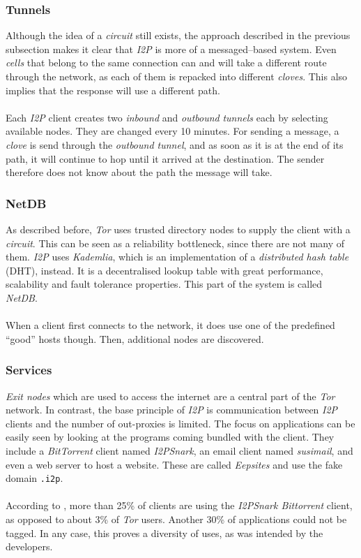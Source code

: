 \documentclass{sig-alternate}
\begin{document}
\subsubsection{Tunnels}
Although the idea of a \emph{circuit} still exists, the approach described in the previous subsection makes it clear that \emph{I2P} is more of a messaged--based system.
Even \emph{cells} that belong to the same connection can and will take a different route through the network, as each of them is repacked into different \emph{cloves}.
This also implies that the response will use a different path.
\\
\\
Each \emph{I2P} client creates two \emph{inbound} and \emph{outbound} \emph{tunnels} each by selecting available nodes.
They are changed every 10 minutes.
For sending a message, a \emph{clove} is send through the \emph{outbound tunnel}, and as soon as it is at the end of its path, it will continue to hop until it arrived at the destination.
The sender therefore does not know about the path the message will take\cite{olivier2011}.
\subsubsection{NetDB}
As described before, \emph{Tor} uses trusted directory nodes to supply the client with a \emph{circuit}.
This can be seen as a reliability bottleneck, since there are not many of them.
\emph{I2P} uses \emph{Kademlia}, which is an implementation of a \emph{distributed hash table} (DHT), instead.
It is a decentralised lookup table with great performance, scalability and fault tolerance properties.
This part of the system is called \emph{NetDB}.
\\
\\
When a client first connects to the network, it does use one of the predefined ``good'' hosts though.
Then, additional nodes are discovered.

\subsubsection{Services}
\emph{Exit nodes} which are used to access the internet are a central part of the \emph{Tor} network.
In contrast, the base principle of \emph{I2P} is communication between \emph{I2P} clients and the number of out-proxies is limited\cite{olivier2011}.
The focus on applications can be easily seen by looking at the programs coming bundled with the client.
They include a \emph{BitTorrent} client named \emph{I2PSnark}, an email client named \emph{susimail}, and even a web server to host a website\cite{i2p}.
These are called \emph{Eepsites} and use the fake domain \texttt{.i2p}.
\\
\\
According to \cite{olivier2011}, more than 25\% of clients are using the \emph{I2PSnark Bittorrent} client, as opposed to about 3\% of \emph{Tor} users.
Another 30\% of applications could not be tagged.
In any case, this proves a diversity of uses, as was intended by the developers.
\end{document}
